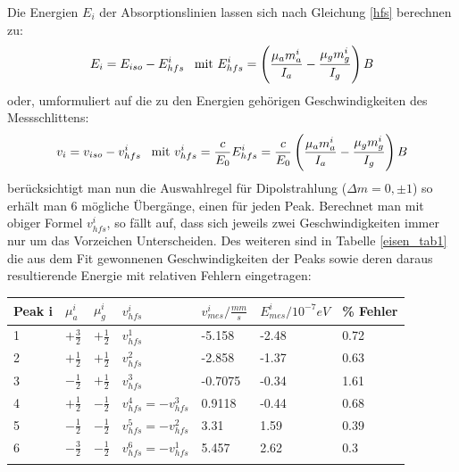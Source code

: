 \documentclass[12pt]{article}
\begin{document}
Die Energien $E_i$ der Absorptionslinien lassen sich nach Gleichung \ref{hfs} berechnen zu:
\begin{align*}
 E_i = E_{iso} - E_{hfs}^i \hspace{5pt} \textnormal{    mit } E_{hfs}^i = \left( \frac{\mu_a m_a^i}{I_a} - \frac{\mu_g m_g^i}{I_g} \right) B
\end{align*}
oder, umformuliert auf die zu den Energien gehörigen Geschwindigkeiten des Messschlittens:
\begin{align}
 v_i = v_{iso} - v_{hfs}^i \hspace{5pt} \textnormal{    mit } v_{hfs}^i = \frac{c}{E_0} E_{hfs}^i = \frac{c}{E_0} \left( \frac{\mu_a m_a^i}{I_a} - \frac{\mu_g m_g^i}{I_g} \right) B
\label{geschw}
\end{align}
berücksichtigt man nun die Auswahlregel für Dipolstrahlung ($\Delta m = 0, \pm 1$) so erhält man 6 mögliche Übergänge, einen für jeden Peak. Berechnet man 
mit obiger Formel $v_{hfs}^i$, so fällt auf, dass sich jeweils zwei Geschwindigkeiten immer nur um das Vorzeichen Unterscheiden.
Des weiteren sind in Tabelle \ref{eisen_tab1} die aus dem Fit gewonnenen Geschwindigkeiten der Peaks sowie deren daraus resultierende Energie mit relativen Fehlern
eingetragen:
\begin{center}
\begin{tabular}{|l|l|l|l|l|l|l|}
\hline
Peak i & $\mu_a^i$ & $\mu_g^i$ & $v_{hfs}^i$ & $v_{mes}^i/\frac{mm}{s}$ & $E_{mes}^i/10^{-7} eV$ & \% Fehler\\
\hline
1 & $+\frac{3}{2}$ & $+\frac{1}{2}$ & $v_{hfs}^1$ & -5.158 & -2.48 & 0.72\\
2 & $+\frac{1}{2}$ & $+\frac{1}{2}$ & $v_{hfs}^2$ & -2.858 & -1.37 & 0.63\\
3 & $-\frac{1}{2}$ & $+\frac{1}{2}$ & $v_{hfs}^3$ & -0.7075 & -0.34 & 1.61\\
4 & $+\frac{1}{2}$ & $-\frac{1}{2}$ & $v_{hfs}^4 = -v_{hfs}^3$ & 0.9118 & -0.44 & 0.68\\
5 & $-\frac{1}{2}$ & $-\frac{1}{2}$ & $v_{hfs}^5 = -v_{hfs}^2$ & 3.31 & 1.59 & 0.39\\
6 & $-\frac{3}{2}$ & $-\frac{1}{2}$ & $v_{hfs}^6 = -v_{hfs}^1$ & 5.457 & 2.62 & 0.3\\
\hline
\label{eisen_tab1}
\end{tabular}
\end{center}
\end{document}
